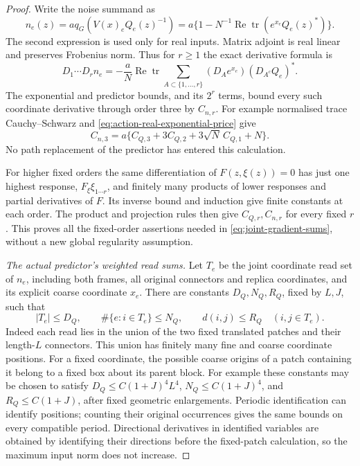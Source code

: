 \documentclass[11pt,reqno]{amsart}
\numberwithin{equation}{section}
\theoremstyle{definition}
\theoremstyle{remark}
\DeclareMathOperator{\tr}{tr}
\begin{document}
\begin{proof}
Write the noise summand as
\[
 n_e(z)=a q_G(V(x)_eQ_e(z)^{-1})
       =a\{1-N^{-1}\operatorname{Re}\tr(e^{x_e}Q_e(z)^*)\}.
\]
The second expression is used only for real inputs. Matrix
adjoint is real linear and preserves Frobenius norm. Thus
for \(r\ge1\) the exact derivative formula is
\begin{equation}
 D_1\cdots D_rn_e
   =-\frac aN\operatorname{Re}\tr
       \sum_{A\subset\{1,\ldots,r\}}
             (D_Ae^{x_e})(D_{A^c}Q_e)^*.
 \label{eq:action-noise-product-rule}
\end{equation}
The exponential and predictor bounds, and its \(2^r\)
terms, bound every such coordinate derivative through
order three by \(C_{n,r}\). For example normalised
trace Cauchy--Schwarz and
\eqref{eq:action-real-exponential-price} give
\[
 C_{n,3}=a\{C_{Q,3}+3C_{Q,2}
                                    +3\sqrt N\,C_{Q,1}+N\}.
\]
No path replacement of the
predictor has entered this calculation.

For higher fixed orders the same differentiation of
\(F(z,\xi(z))=0\) has just one highest response,
\(F_\xi\xi_{1\cdots r}\), and finitely many products
of lower responses and partial derivatives of \(F\).
Its inverse bound and induction give finite constants
at each order. The product and projection rules then
give \(C_{Q,r},C_{n,r}\) for every fixed \(r\). This
proves all the fixed-order assertions needed in
\eqref{eq:joint-gradient-sums}, without a new global
regularity assumption.

\smallskip\noindent
\emph{The actual predictor's weighted read sums.}
Let \(T_e\) be the joint coordinate read set of \(n_e\),
including both frames, all original connectors and replica
coordinates, and its explicit coarse coordinate \(x_e\).
There are constants \(D_Q,N_Q,R_Q\), fixed by \(L,J\),
such that
\[
 |T_e|\le D_Q,\qquad
 \#\{e:i\in T_e\}\le N_Q,\qquad
                d(i,j)\le R_Q\quad(i,j\in T_e).
\]
Indeed each read lies in the union of the two fixed translated
patches and their length-\(L\) connectors. This union has
finitely many fine and coarse coordinate positions. For a
fixed coordinate, the possible coarse origins of a patch
containing it belong to a fixed box about its parent block.
For example these constants may be chosen to satisfy
\(D_Q\le C(1+J)^4L^4\), \(N_Q\le C(1+J)^4\), and
\(R_Q\le C(1+J)\), after fixed geometric enlargements.
Periodic identification
can identify positions; counting their original occurrences
gives the same bounds on every compatible period. Directional
derivatives in identified variables are obtained by identifying
their directions before the fixed-patch calculation, so the
maximum input norm does not increase.


\end{proof}
\end{document}

